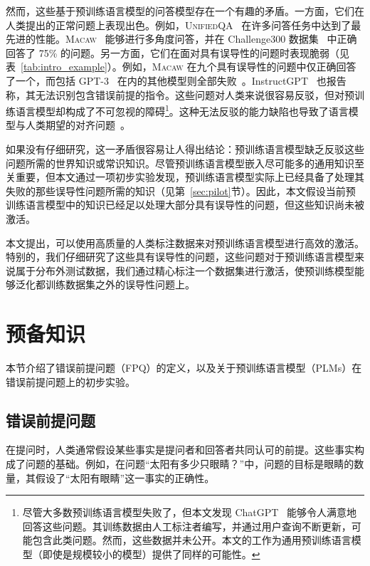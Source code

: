 然而，这些基于预训练语言模型的问答模型存在一个有趣的矛盾。一方面，它们在人类提出的正常问题上表现出色。例如，\textsc{UnifiedQA}~\cite{khashabi-etal-2020-unifiedqa} 在许多问答任务中达到了最先进的性能。\textsc{Macaw}~\cite{tafjord2021general} 能够进行多角度问答，并在 Challenge300 数据集~\cite{tafjord2021general} 中正确回答了 75\% 的问题。另一方面，它们在面对具有误导性的问题时表现脆弱（见表~\ref{tab:intro_example}）。例如，\textsc{Macaw} 在九个具有误导性的问题中仅正确回答了一个，而包括 GPT-3~\cite{brown2020language} 在内的其他模型则全部失败~\cite{tafjord2021general}。InstructGPT~\cite{ouyang2022training} 也报告称，其无法识别包含错误前提的指令。这些问题对人类来说很容易反驳，但对预训练语言模型却构成了不可忽视的障碍\footnote{尽管大多数预训练语言模型失败了，但本文发现 ChatGPT~\cite{chatgpt} 能够令人满意地回答这些问题。其训练数据由人工标注者编写，并通过用户查询不断更新，可能包含此类问题。然而，这些数据并未公开。本文的工作为通用预训练语言模型（即使是规模较小的模型）提供了同样的可能性。}。这种无法反驳的能力缺陷也导致了语言模型与人类期望的对齐问题~\cite{kenton2021alignment}。

如果没有仔细研究，这一矛盾很容易让人得出结论：预训练语言模型缺乏反驳这些问题所需的世界知识或常识知识。尽管预训练语言模型嵌入尽可能多的通用知识至关重要，但本文通过一项初步实验发现，预训练语言模型实际上已经具备了处理其失败的那些误导性问题所需的知识（见第~\ref{sec:pilot}节）。因此，本文假设当前预训练语言模型中的知识已经足以处理大部分具有误导性的问题，但这些知识尚未被激活。

本文提出，可以使用高质量的人类标注数据来对预训练语言模型进行高效的激活。特别的，我们仔细研究了这些具有误导性的问题，这些问题对于预训练语言模型来说属于分布外测试数据，我们通过精心标注一个数据集进行激活，使预训练模型能够泛化都训练数据集之外的误导性问题上。


\section{预备知识}
本节介绍了错误前提问题（FPQ）的定义，以及关于预训练语言模型（PLMs）在错误前提问题上的初步实验。

\subsection{错误前提问题}
在提问时，人类通常假设某些事实是提问者和回答者共同认可的前提。这些事实构成了问题的基础。例如，在问题“太阳有多少只眼睛？”中，问题的目标是眼睛的数量，其假设了“太阳有眼睛”这一事实的正确性。

